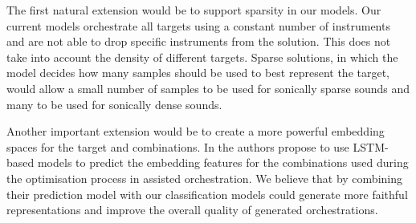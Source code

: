 \documentclass[runningheads,a4paper]{llncs}
\begin{document}
The first natural extension would be to support sparsity in our models. Our current models orchestrate all targets using a constant number of instruments and are not able to drop specific instruments from the solution. This does not take into account the density of different targets. Sparse solutions, in which the model decides how many samples should be used to best represent the target, would allow a small number of samples to be used for sonically sparse sounds and many to be used for sonically dense sounds. %

Another important extension would be to create a more powerful embedding spaces for the target and combinations. In \cite{Gillick19} the authors propose to use LSTM-based models to predict the embedding features for the combinations used during the optimisation process in assisted orchestration. We believe that by combining their prediction model with our classification models could generate more faithful representations and improve the overall quality of generated orchestrations.
\end{document}

